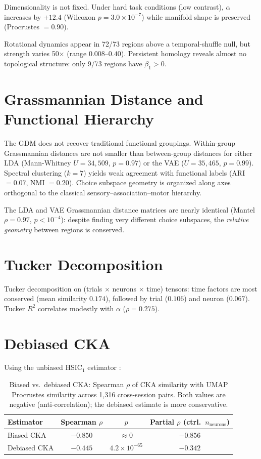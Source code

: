 \documentclass{article}
\begin{document}
Dimensionality is not fixed. Under hard task conditions (low contrast), $\alpha$ increases by $+12.4$ (Wilcoxon $p = 3.0 \times 10^{-7}$) while manifold shape is preserved (Procrustes $= 0.90$).

Rotational dynamics appear in 72/73 regions above a temporal-shuffle null, but strength varies 50$\times$ (range $0.008$--$0.40$). Persistent homology reveals almost no topological structure: only 9/73 regions have $\beta_1 > 0$.


\section{Grassmannian Distance and Functional Hierarchy}
\label{app:gdm_hierarchy}

The GDM does not recover traditional functional groupings. Within-group Grassmannian distances are not smaller than between-group distances for either LDA (Mann-Whitney $U = 34{,}509$, $p = 0.97$) or the VAE ($U = 35{,}465$, $p = 0.99$). Spectral clustering ($k = 7$) yields weak agreement with functional labels (ARI $= 0.07$, NMI $= 0.20$). Choice subspace geometry is organized along axes orthogonal to the classical sensory--association--motor hierarchy.

The LDA and VAE Grassmannian distance matrices are nearly identical (Mantel $\rho = 0.97$, $p < 10^{-4}$): despite finding very different choice subspaces, the \emph{relative geometry} between regions is conserved.


\section{Tucker Decomposition}
\label{app:tucker}

Tucker decomposition on (trials $\times$ neurons $\times$ time) tensors: time factors are most conserved (mean similarity $0.174$), followed by trial ($0.106$) and neuron ($0.067$). Tucker $R^2$ correlates modestly with $\alpha$ ($\rho = 0.275$).


\section{Debiased CKA}
\label{app:debiased_cka}

Using the unbiased HSIC$_1$ estimator \citep{song2012feature}:

\begin{table}[h]
\centering
\small
\caption{Biased vs.\ debiased CKA: Spearman $\rho$ of CKA similarity with UMAP Procrustes similarity across 1,316 cross-session pairs. Both values are negative (anti-correlation); the debiased estimate is more conservative.}
\label{tab:debiased_cka}
\begin{tabular}{@{}lccc@{}}
\toprule
\textbf{Estimator} & \textbf{Spearman $\rho$} & \textbf{$p$} & \textbf{Partial $\rho$ (ctrl.\ $n_{\text{neurons}}$)} \\
\midrule
Biased CKA & $-0.850$ & $\approx 0$ & $-0.856$ \\
Debiased CKA & $-0.445$ & $4.2 \times 10^{-65}$ & $-0.342$ \\
\bottomrule
\end{tabular}
\end{table}
\end{document}
